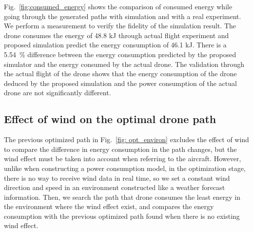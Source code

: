 \documentclass[journal]{./template/IEEEtran}
\begin{document}
Fig.~\ref{fig:consumed_energy} shows the comparison of consumed energy while going through the generated paths with simulation and with a real experiment. We perform a measurement to verify the fidelity of the simulation result.
The drone consumes the energy of 48.8 kJ through actual flight experiment and proposed simulation predict the energy consumption of 46.1 kJ.
There is a 5.54~\% difference between the energy consumption predicted by the proposed simulator and the energy consumed by the actual drone.
The validation through the actual flight of the drone shows that the energy consumption of the drone deduced by the proposed simulation and the power consumption of the actual drone are not significantly different.





\subsection{Effect of wind on the optimal drone path}

The previous optimized path in Fig.~\ref{fig: opt_environ} excludes the effect of wind to compare the difference in energy consumption in the path changes, but the wind effect must be taken into account when referring to the aircraft.
However, unlike when constructing a power consumption model, in the optimization stage, there is no way to receive wind data in real time, so we set a constant wind direction and speed in an environment constructed like a weather forecast information.
Then, we search the path that drone consumes the least energy in the environment where the wind effect exist, and compares the energy consumption with the previous optimized path found when there is no existing wind effect.
\end{document}
